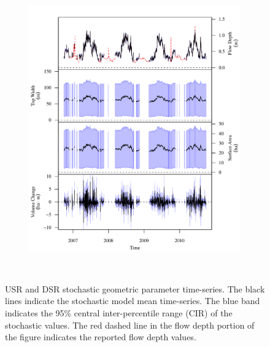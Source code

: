 \begin{landscape}
\begin{figure}
\begin{subfigure}{0.7\textwidth}
			\includegraphics[width=\tableCustomSize]{"Figures/Results_USR/Stochastic/G TS B"}
		\end{subfigure}\\
	\caption[USR and DSR stochastic geometric parameter time-series.]{USR and DSR stochastic geometric parameter time-series. The black lines indicate the stochastic model mean time-series.  The blue band indicates the 95\% central inter-percentile range (CIR) of the stochastic values.  The red dashed line in the flow depth portion of the figure indicates the reported flow depth values.}
	\label{fig:GeoTS_US}
	\end{figure}
\end{landscape}
\subfiguremid

